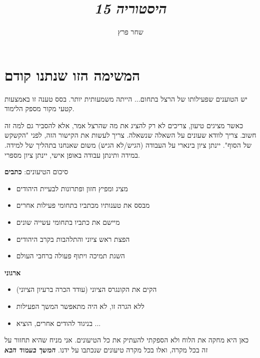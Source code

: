 \documentclass[]{article}
\author{שחר פרץ}
\title{\textit{היסטוריה 15}}
\newcommand\npage {\vfil {\hfil \textbf{\textit{המשך בעמוד הבא}}} \hfil \vfil \pagebreak}
\begin{document}
	\maketitle
	\section{המשימה הזו שנתנו קודם}
	יש הטוענים שפעילותו של הרצל בתחום... הייתה משמעותית יותר. בסס טענה זו באמצעות קטעי מקור מספק הלימוד. 
	
	כאשר מציגים טיעון, צריכים לא רק להציג את מה שהרצל אמר, אלא להסביר גם למה זה חשוב. צריך לוודא שעונים על השאלה שנשאלה. צריך לעשות את הקישור הזה, לפני "הקשקש של הסוף". יינתן ציון בינארי על העבודה (הגיש/לא הגיש) משום שאנחנו בתהליך של למידה. במידה ותינתן עבודה באופן אישי, יינתן ציון מספרי. 
	
	סיכום הטיעונים: 
	\textbf{כתבים}	
	\begin{itemize}
		\item מציג ומפיץ חזון ופתרונות לבעיית היהודים
		\item מבסס את טענותיו מכתביו בתחומי פעילות אחרים
		\item מיישם את כתביו בתחומי עשייה שונים
		\item הפצת ראש ציוני והתלהבות בקרב היהודים
		\item השגת תמיכה ויתוף פעולה ברחבי העולם
	\end{itemize}
	\textbf{ארגוני}
	\begin{itemize}
		\item הקים את הקונגרס הציוני (עודד הכרה ברעיון הציוני)
		\item ללא הגרה זו, לא היה מתאפשר המשך הפעילות
		\item בניגוד להודים אחרים, הוציא ... 
	\end{itemize}
	
	כאן היא מחקה את הלוח ולא הספקתי להעתיק את כל הטיעונים. אני מניח שהיא תחזור על זה בכל מקרה, ואלו בכל מקרה טיעונים שנכתבו על ידנו. 
	\npage
	
\end{document}
